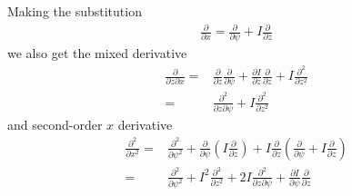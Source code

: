 \documentclass[12pt]{article}
\def\L{\left}
\def\R{\right}
\newcommand{\deriv}[2]{\ensuremath{\frac{\partial #1}{\partial #2}}}
\begin{document}
Making the substitution
%
\begin{align*}
\deriv{}{x} = \deriv{}{\psi} + I\deriv{}{z}
\end{align*}
%
we also get the mixed derivative
%
\begin{align*}
\frac{\partial}{\partial z\partial x} =& \deriv{}{z}\deriv{}{\psi} +
    \deriv{I}{z}\deriv{}{z} + I\frac{\partial^2}{\partial z^2} \nonumber \\ =&
    \frac{\partial^2}{\partial z\partial \psi} + I\frac{\partial^2}{\partial
    z^2}
\end{align*}
%
and second-order $x$ derivative
%
\begin{align*}
\frac{\partial^2}{\partial x^2} =& \frac{\partial^2}{\partial \psi^2} +
    \deriv{}{\psi}\L(I\deriv{}{z}\R) + I\deriv{}{z}\L(\deriv{}{\psi}
    + I\deriv{}{z}\R) \nonumber \\ =& \frac{\partial^2}{\partial \psi^2} +
        I^2\frac{\partial^2}{\partial z^2} + 2I\frac{\partial^2}{\partial
        z\partial \psi} + \deriv{I}{\psi}\deriv{}{z}
\end{align*}
%
\end{document}
